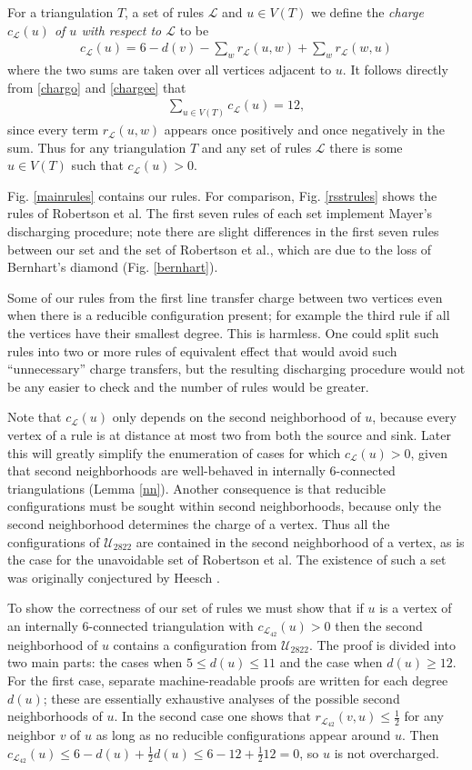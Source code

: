 \documentclass[11pt]{article}
\newcommand{\eqn}{\begin{eqnarray}}
\newcommand{\uneq}{\end{eqnarray}}
\newcommand{\mcal}{\mathcal}
\newcommand{\ncmath}{2822}
\begin{document}
For a triangulation $T$, a set of rules $\mcal{L}$ and $u \in V(T)$ we define the \emph{charge $c_\mcal{L}(u)$ of $u$ with respect to $\mcal{L}$} to be
\eqn
\label{chargo}
c_\mcal{L}(u) = 6 - d(v) - \sum_w r_\mcal{L}(u,w) + \sum_w r_\mcal{L}(w,u)
\uneq
where the two sums are taken over all vertices adjacent to $u$. It follows directly from \eqref{chargo} and \eqref{chargee} that
\eqn
\label{sumcharge}
\sum_{u\in V(T)} c_{\mcal{L}}(u) = 12,
\uneq 
since every term $r_\mcal{L}(u,w)$ appears once positively and once negatively in the sum. Thus for any triangulation $T$ and any set of rules $\mcal{L}$ there is some $u \in V(T)$ such that $c_\mcal{L}(u) > 0$.

Fig$.$ \ref{mainrules} contains our rules. For comparison, Fig$.$ \ref{rsstrules} shows the rules of Robertson et al. The first seven rules of each set implement Mayer's discharging procedure; note there are slight differences in the first seven rules between our set and the set of Robertson et al., which are due to the loss of Bernhart's diamond (Fig$.$ \ref{bernhart}).

Some of our rules from the first line transfer charge between two vertices even when there is a reducible configuration present; for example the third rule if all the vertices have their smallest degree. This is harmless. One could split such rules into two or more rules of equivalent effect that would avoid such ``unnecessary'' charge transfers, but the resulting discharging procedure would not be any easier to check and the number of rules would be greater. 

Note that $c_\mcal{L}(u)$ only depends on the second neighborhood of $u$, because every vertex of a rule is at distance at most two from both the source and sink. 
Later this will greatly simplify the enumeration of 
cases for which $c_{\mcal{L}}(u) > 0$, given that second neighborhoods are well-behaved in internally 6-connected triangulations (Lemma \ref{nn}).
Another consequence is that reducible configurations must be sought within second neighborhoods, because only the second neighborhood determines the charge of a vertex. 
Thus all the configurations of $\mcal{U}_{\ncmath}$ are contained in the second neighborhood of a vertex, as is the case for the unavoidable set of Robertson et al. 
The existence of such a set was originally conjectured by Heesch \cite{heesch}. 

To show the correctness of our set of rules we must show that if $u$ is a vertex of an internally 6-connected triangulation with $c_{\mcal{L}_{42}}(u) > 0$ then 
the second neighborhood of $u$ contains a configuration from $\mcal{U}_{\ncmath}$. The proof is divided into two main parts: the cases when $5 \leq d(u) \leq 11$ and the case when $d(u) \geq 12$. For the first case, separate machine-readable proofs are written for each degree $d(u)$; these are essentially exhaustive analyses of the possible second neighborhoods of $u$. In the second case one shows that $r_{\mcal{L}_{42}}(v,u) \leq \frac{1}{2}$ for any neighbor $v$ of $u$ as long as no reducible configurations appear around $u$. Then $c_{\mcal{L}_{42}}(u) \leq 6 - d(u) + \frac{1}{2}d(u) \leq 6 - 12 + \frac{1}{2}12 = 0$, so $u$ is not overcharged.
\end{document}
